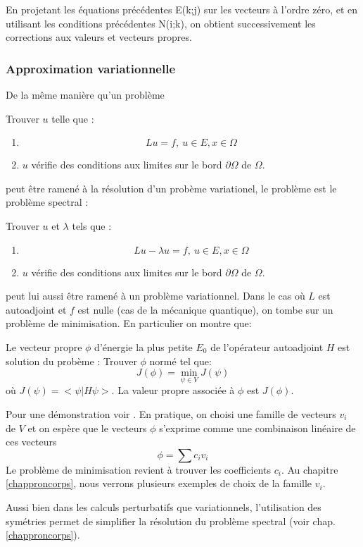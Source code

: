 \documentclass[12pt]{book}
\begin{document}
En projetant les \'equations pr\'ec\'edentes E(k;j) sur les vecteurs \`a
l'ordre 
z\'ero, et en utilisant les conditions pr\'ec\'edentes N(i;k),
on obtient successivement les corrections aux valeurs et vecteurs propres.

\subsubsection{Approximation variationnelle}
De la m\^eme mani\`ere qu'un probl\`eme
\begin{prob}
Trouver $u$ telle que :
\begin{enumerate}
\item 
\begin{equation}
Lu=f,\ u\in E, x\in\Omega
\end{equation}
\item $u$ v\'erifie des conditions aux limites  sur le bord
$\partial 
\Omega$ de $\Omega$.
\end{enumerate}
\end{prob}
peut \^etre ramen\'e \`a la r\'esolution d'un prob\`eme variationel,
le probl\`eme est le probl\`eme spectral : 
\begin{prob}
Trouver $u$ et $\lambda$ tels que :
\begin{enumerate}
\item 
\begin{equation}
Lu-\lambda u=f,\ u\in E, x\in\Omega
\end{equation}
\item $u$ v\'erifie des conditions aux limites sur le bord $\partial
\Omega$ de $\Omega$.
\end{enumerate}
\end{prob}
peut lui aussi \^etre ramen\'e \`a un probl\`eme variationnel.
Dans le cas o\`u $L$ est autoadjoint et $f$ est nulle (cas de la
m\'ecanique quantique), on tombe sur un probl\`eme de minimisation. En
particulier on montre que:
\begin{thm}
Le vecteur propre $\phi$ d'\'energie la plus petite $E_0$  de
l'op\'erateur autoadjoint 
$H$ est solution du prob\`eme :
Trouver $\phi$ norm\'e tel que:
\begin{equation}
J(\phi)=\min_{\psi\in V}J(\psi)
\end{equation}
o\`u $J(\psi)=<\psi|H\psi>$. La valeur propre associ\'ee \`a $\phi$
est $J(\phi)$.
\end{thm}
Pour une d\'emonstration voir \cite{ph:mecaq:Cohen73,ph:mecaq:Rivail89}.
En pratique, on choisi une famille de vecteurs $v_i$ de $V$ et on
esp\`ere que le vecteurs $\phi$ s'exprime comme une combinaison
lin\'eaire de ces vecteurs
\begin{equation}
\phi=\sum c_iv_i
\end{equation}
Le probl\`eme de minimisation revient \`a trouver les coefficients
$c_i$. Au chapitre \ref{chapproncorps}, nous verrons plusieurs exemples
de choix de la famille $v_i$.
\begin{rem}
Aussi bien dans les calculs perturbatifs que variationnels,
l'utilisation des sym\'etries permet de simplifier la r\'esolution du
probl\`eme spectral (voir chap.\ref{chapproncorps}).
\end{rem}
\end{document}
